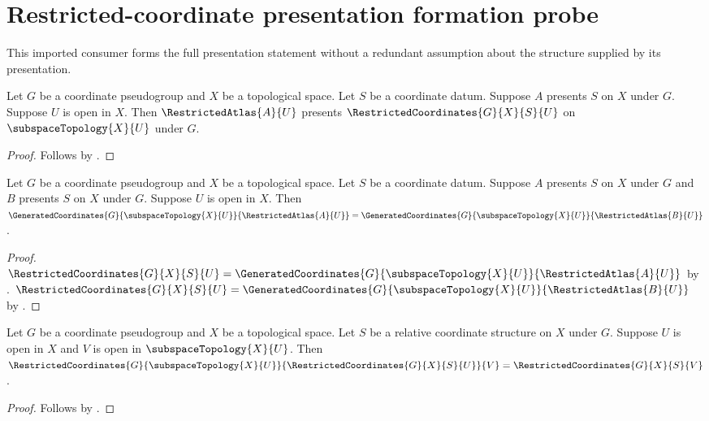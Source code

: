 \section{Restricted-coordinate presentation formation probe}



This imported consumer forms the full presentation statement without a
redundant assumption about the structure supplied by its presentation.

\begin{theorem}\label{restricted_coordinates_presentation_consumer}
    Let $G$ be a coordinate pseudogroup and $X$ be a topological space.
    Let $S$ be a coordinate datum.
    Suppose $A$ presents $S$ on $X$ under $G$.
    Suppose $U$ is open in $X$.
    Then $\RestrictedAtlas{A}{U}$ presents $\RestrictedCoordinates{G}{X}{S}{U}$
        on $\subspaceTopology{X}{U}$ under $G$.
\end{theorem}
\begin{proof}
    Follows by .
\end{proof}

\begin{theorem}\label{restricted_coordinates_two_presentations_consumer}
    Let $G$ be a coordinate pseudogroup and $X$ be a topological space.
    Let $S$ be a coordinate datum.
    Suppose $A$ presents $S$ on $X$ under $G$ and $B$ presents $S$ on $X$ under $G$.
    Suppose $U$ is open in $X$.
    Then $\GeneratedCoordinates{G}{\subspaceTopology{X}{U}}{\RestrictedAtlas{A}{U}}
        =\GeneratedCoordinates{G}{\subspaceTopology{X}{U}}{\RestrictedAtlas{B}{U}}$.
\end{theorem}
\begin{proof}
    $\RestrictedCoordinates{G}{X}{S}{U}
        =\GeneratedCoordinates{G}{\subspaceTopology{X}{U}}{\RestrictedAtlas{A}{U}}$ by
        .
    $\RestrictedCoordinates{G}{X}{S}{U}
        =\GeneratedCoordinates{G}{\subspaceTopology{X}{U}}{\RestrictedAtlas{B}{U}}$ by
        .
\end{proof}

\begin{theorem}\label{nested_restricted_coordinates_consumer}
    Let $G$ be a coordinate pseudogroup and $X$ be a topological space.
    Let $S$ be a relative coordinate structure on $X$ under $G$.
    Suppose $U$ is open in $X$ and $V$ is open in $\subspaceTopology{X}{U}$.
    Then $\RestrictedCoordinates{G}{\subspaceTopology{X}{U}}{\RestrictedCoordinates{G}{X}{S}{U}}{V}
        =\RestrictedCoordinates{G}{X}{S}{V}$.
\end{theorem}
\begin{proof}
    Follows by .
\end{proof}


